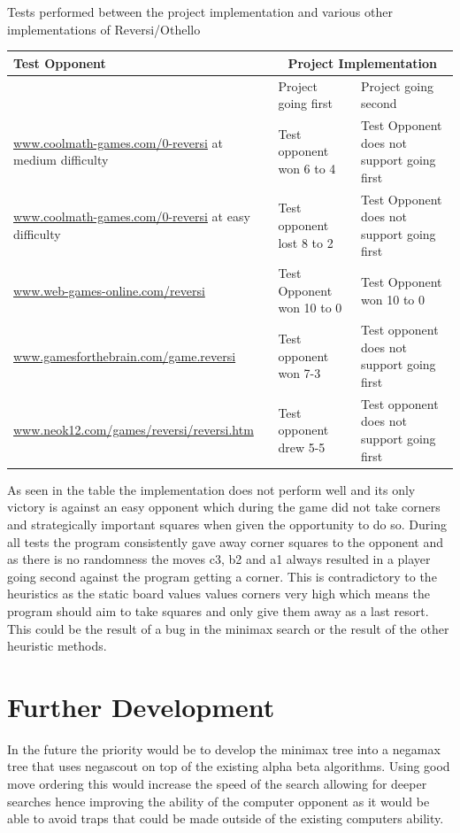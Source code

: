 \documentclass[final]{cmpreport}
\begin{document}
\begin{cmptable}[htb]{Tests performed between the project implementation and various other implementations of Reversi/Othello}
	\begin{tabular}{|p{4cm}|p{4cm}|p{4cm}|}
		\hline
		Test Opponent & \multicolumn{2}{|c|}{Project Implementation}\\ \hline
		& Project going first & Project going second \\ \hline
		\url{www.coolmath-games.com/0-reversi} at medium difficulty & Test opponent won 6 to 4 & Test Opponent does not support going first \\ \hline
		\url{www.coolmath-games.com/0-reversi} at easy difficulty & Test opponent lost 8 to 2 & Test Opponent does not support going first \\ \hline
		\url{www.web-games-online.com/reversi} & Test Opponent won 10 to 0 & Test Opponent won 10 to 0 \\ \hline
		\url{www.gamesforthebrain.com/game.reversi} & Test opponent won 7-3  & Test opponent does not support going first \\ \hline
		\url{www.neok12.com/games/reversi/reversi.htm} & Test opponent drew 5-5  & Test opponent does not support going first \\ \hline
	\end{tabular}
\end{cmptable}

As seen in the table the implementation does not perform well and its only victory is against an easy opponent which during the game did not take corners and strategically important squares when given the opportunity to do so. During all tests the program consistently gave away corner squares to the opponent and as there is no randomness the moves c3, b2 and a1 always resulted in a player going second against the program getting a corner. This is contradictory to the heuristics as the static board values values corners very high which means the program should aim to take squares and only give them away as a last resort. This could be the result of a bug in the minimax search or the result of the other heuristic methods.
\section{Further Development}
In the future the priority would be to develop the minimax tree into a negamax tree that uses negascout on top of the existing alpha beta algorithms. Using good move ordering this would increase the speed of the search allowing for deeper searches hence improving the ability of the computer opponent as it would be able to avoid traps that could be made outside of the existing computers ability.
\end{document}
